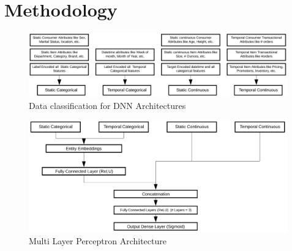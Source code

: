 \section{Methodology}
\label{sec:methodology}

\begin{figure}[h]
\begin{center}
\includegraphics[width=4.4in]{img/dnndata.png}
\end{center}
\caption{Data classification for DNN Architectures}
\end{figure}

\begin{figure}[h]
\begin{center}
\includegraphics[width=4.4in]{img/MLP.png} 
\end{center}
\caption{Multi Layer Perceptron Architecture}
\end{figure}
